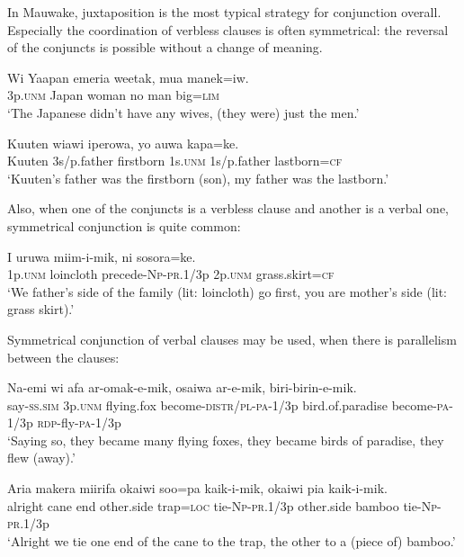 In Mauwake, juxtaposition is the most typical strategy for conjunction overall. Especially the coordination of verbless clauses is often symmetrical: the reversal of the conjuncts is possible without a change of meaning. 

\ea%
\label{ex:x1367}
\gll Wi  Yaapan  emeria  weetak,  mua  manek=iw. \\
3p.\textsc{unm}  Japan  woman  no  man  big=\textsc{lim}\\
\glt `The Japanese didn't have any wives, (they were) just the men.'
\z


\ea%
\label{ex:x1390}
\gll Kuuten  wiawi  iperowa,  yo  auwa  kapa=ke. \\
Kuuten  3s/p.father  firstborn  1s.\textsc{unm}  1s/p.father  lastborn=\textsc{cf}      \\
\glt `Kuuten's father was the firstborn (son), my father was the lastborn.'
\z




Also, when one of the conjuncts is a verbless clause and another is a verbal one, symmetrical conjunction is quite common:

\ea%
\label{ex:x1391}
\gll I  uruwa  miim-i-mik,  ni  sosora=ke.\\
1p.\textsc{unm}  loincloth  precede-\textsc{Np}-\textsc{pr}.1/3p  2p.\textsc{unm}  grass.skirt=\textsc{cf}\\
\glt `We father's side of the family (lit: loincloth) go first, you are mother's side (lit: grass skirt).'
\z




Symmetrical conjunction of verbal clauses may be used, when there is parallelism between the clauses:

\ea%
\label{ex:x1368}
\gll Na-emi  wi  afa  ar-omak-e-mik, osaiwa  ar-e-mik,  biri-birin-e-mik.\\
say-\textsc{ss}.\textsc{sim}  3p.\textsc{unm}  flying.fox  become-\textsc{distr}/\textsc{pl}-\textsc{pa}-1/3p bird.of.paradise  become-\textsc{pa}-1/3p  \textsc{rdp}-fly-\textsc{pa}-1/3p\\
\glt `Saying so, they became many flying foxes, they became birds of paradise, they flew (away).'
\z

\ea%
\label{ex:x1392}
\gll Aria  makera  miirifa  okaiwi  soo=pa  kaik-i-mik, okaiwi  pia  kaik-i-mik.\\
alright  cane  end  other.side  trap=\textsc{loc}  tie-\textsc{Np}-\textsc{pr}.1/3p other.side  bamboo  tie-\textsc{Np}-\textsc{pr}.1/3p\\
\glt `Alright we tie one end of the cane to the trap, the other to a (piece of) bamboo.'
\z

